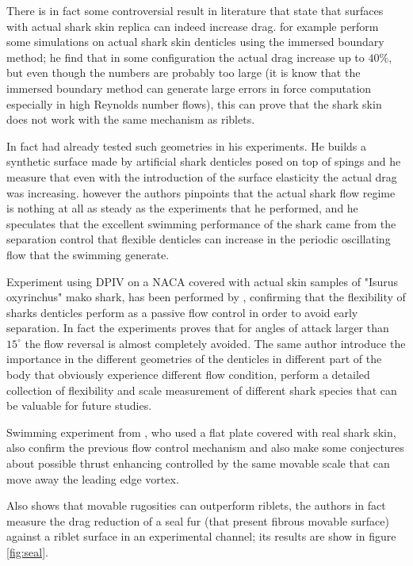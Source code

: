 There is in fact some controversial result in literature that state that surfaces with actual shark skin replica can indeed increase drag.
\citet{boomsma2016direct} for example perform some simulations on actual shark skin denticles using the immersed boundary method; he find that in some configuration 
the actual drag increase up to $40\%$, but even though the numbers are probably too large (it is know that the immersed boundary method can generate large errors in force computation especially in high Reynolds number flows), this can prove that the shark skin does not work with the same mechanism as riblets.

In fact \citet{bechert1997natural} had already tested such geometries in his experiments. 
He builds a synthetic surface made by artificial shark denticles posed on top of spings and he measure that even with the introduction of the surface elasticity the actual drag was increasing.
however the authors pinpoints that the actual shark flow regime is nothing at all as steady as the experiments that he performed, and he speculates that the excellent swimming performance of the shark came from the separation control that flexible denticles can increase in the periodic oscillating flow that the swimming generate.

Experiment using DPIV on a NACA covered with actual skin samples of "Isurus oxyrinchus" mako shark, has been performed by \citet{lang2014SharkControl}, confirming that the flexibility of sharks denticles perform as a passive flow control in order to avoid early separation.
In fact the experiments proves that for angles of attack larger than $15^{\circ}$ the flow reversal is almost completely avoided.
The same author introduce the importance in the different geometries of the denticles in different part of the body that obviously experience different flow condition,
\citet{motta2012Shark} perform a detailed collection of flexibility and scale measurement of different shark species that can be valuable for future studies.

Swimming experiment from \cite{Oeffner785}, who used a flat plate covered with real shark skin, also confirm the previous flow control mechanism and also make some conjectures about possible thrust enhancing controlled by the same movable scale that can move away the leading edge vortex.

Also \citet{itoh2006turbulent} shows that movable rugosities can outperform riblets, the authors in fact measure the drag reduction of a seal fur (that present fibrous movable surface) against a riblet surface in an experimental channel; its results are show in figure \ref{fig:seal}.

